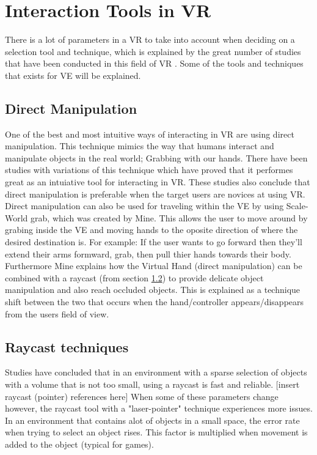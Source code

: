 \section{Interaction Tools in VR}
\label{theory:toolsandtech}
There is a lot of parameters in a VR to take into account when deciding on a selection tool and technique, which is explained by the great number of studies that have been conducted in this field of VR \cite{tools:poupyrev1996go,tools:mine1997moving,tools:Cutler1997,tools:bowman2001introduction}. Some of the tools and techniques that exists for VE will be explained.

\subsection{Direct Manipulation}
\label{theory:toolsandtech:direct}
One of the best and most intuitive ways of interacting in VR are using direct manipulation\cite{tools:jacoby1994gestural}. This technique mimics the way that humans interact and manipulate objects in the real world; Grabbing with our hands. There have been studies with variations of this technique which have proved that it performes great as an intuiative tool for interacting in VR\cite{tools:Buchmann2004,tools:Cutler1997}. These studies also conclude that direct manipulation is preferable when the target users are novices at using VR. Direct manipulation can also be used for traveling within the VE by using Scale-World grab, which was created by Mine\cite{tools:mine1997moving}. This allows the user to move around by grabing inside the VE and moving hands to the oposite direction of where the desired destination is. For example: If the user wants to go forward then they'll extend their arms formward, grab, then pull thier hands towards their body. Furthermore Mine explains how the Virtual Hand (direct manipulation) can be combined with a raycast (from section \ref{theory:toolsandtech:raycast}) to provide delicate object manipulation and also reach occluded objects. This is explained as a technique shift between the two that occurs when the hand/controller appears/disappears from the users field of view.

\subsection{Raycast techniques}
\label{theory:toolsandtech:raycast}
Studies have concluded that in an environment with a sparse selection of objects with a volume that is not too small, using a raycast is fast and reliable. [insert raycast (pointer) references here] When some of these parameters change however, the raycast tool with a "laser-pointer" technique experiences more issues. In an environment that contains alot of objects in a small space, the error rate when trying to select an object rises\cite{tools:ware1988using}. This factor is multiplied when movement is added to the object (typical for games).

